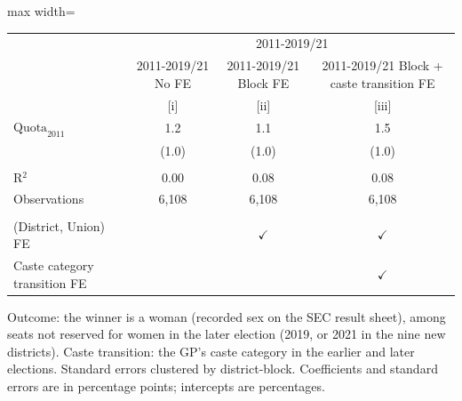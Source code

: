 
\begingroup
\centering
\scriptsize
\begin{adjustbox}{max width=\linewidth}
   \begin{threeparttable}[b]
      \begin{tabular}{lccc}
         \toprule
          & \multicolumn{3}{c}{2011-2019/21} \\
                                      & 2011-2019/21 No FE & 2011-2019/21 Block FE & 2011-2019/21 Block + caste transition FE \\
                                      & [i]                & [ii]                  & [iii]\\
         \midrule
         $\text{Quota}_{2011}$        & 1.2                & 1.1                   & 1.5\\
                                      & (1.0)              & (1.0)                 & (1.0)\\
          \\
         R$^2$                        & 0.00               & 0.08                  & 0.08\\
         Observations                 & 6,108              & 6,108                 & 6,108\\
          \\
         (District, Union) FE         &                    & $\checkmark$          & $\checkmark$\\
         Caste category transition FE &                    &                       & $\checkmark$\\
         \bottomrule
      \end{tabular}

      \begin{tablenotes}
         \item Outcome: the winner is a woman (recorded sex on the SEC result sheet), among seats not reserved for women in the later election (2019, or 2021 in the nine new districts). Caste transition: the GP's caste category in the earlier and later elections. Standard errors clustered by district-block. Coefficients and standard errors are in percentage points; intercepts are percentages.
      \end{tablenotes}
   \end{threeparttable}
\end{adjustbox}
\par\endgroup


